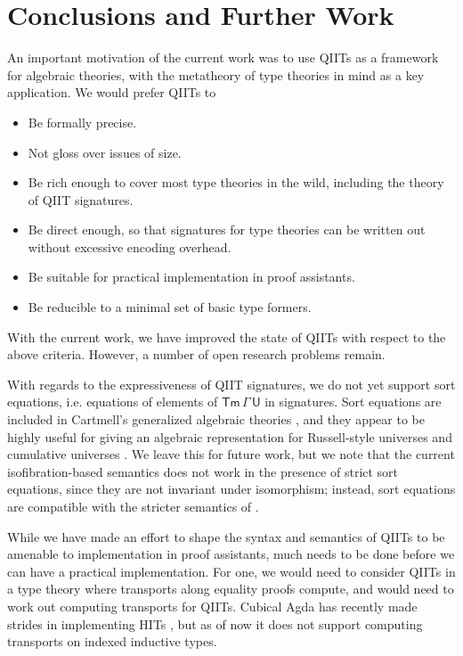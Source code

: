 \documentclass{article}
\theoremstyle{definition}
\theoremstyle{theorem}
\newcommand{\Tm}{\mathsf{Tm}}
\newcommand{\U}{\mathsf{U}}
\begin{document}
\section{Conclusions and Further Work}
\label{sec:conclusion}

An important motivation of the current work was to use QIITs as a framework for
algebraic theories, with the metatheory of type theories in mind as a key
application. We would prefer QIITs to
\begin{itemize}
\item Be formally precise.
\item Not gloss over issues of size.
\item Be rich enough to cover most type theories in the wild, including the theory
      of QIIT signatures.
\item Be direct enough, so that signatures for type theories can
      be written out without excessive encoding overhead.
\item Be suitable for practical implementation in proof assistants.
\item Be reducible to a minimal set of basic type formers.
\end{itemize}

With the current work, we have improved the state of QIITs with respect to
the above criteria. However, a number of open research problems remain.

With regards to the expressiveness of QIIT signatures, we do not yet
support sort equations, i.e. equations of elements of $\Tm\,\Gamma\,\U$ in
signatures. Sort equations are included in Cartmell's generalized algebraic
theories \cite{gat}, and they appear to be highly useful for giving an algebraic
representation for Russell-style universes and cumulative universes
\cite{sterling2019algebraic}. We leave this for future work, but we note that
the current isofibration-based semantics does not work in the presence of strict
sort equations, since they are not invariant under isomorphism; instead, sort
equations are compatible with the stricter semantics of
\cite{kaposi2019constructing}.

While we have made an effort to shape the syntax and semantics of QIITs to
be amenable to implementation in proof assistants, much needs to be done before
we can have a practical implementation. For one, we would need to consider QIITs
in a type theory where transports along equality proofs compute, and would need
to work out computing transports for QIITs. Cubical Agda has recently made
strides in implementing HITs \cite{vezzosicubical}, but as of now it does not
support computing transports on indexed inductive types.
\end{document}
